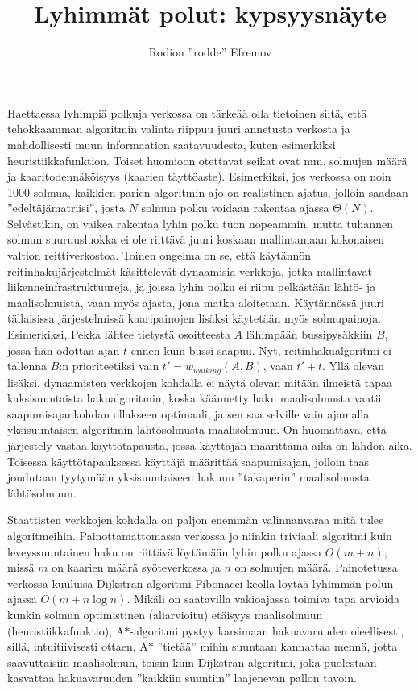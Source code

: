 \documentclass[12pt]{article}
\title{Lyhimmät polut: kypsyysnäyte}
\author{Rodion ''rodde'' Efremov}
\begin{document}
\maketitle
\newpage

\noindent Haettaessa lyhimpiä polkuja verkossa on tärkeää olla tietoinen siitä, että tehokkaamman algoritmin valinta riippuu juuri annetusta verkosta ja mahdollisesti muun informaation saatavuudesta, kuten esimerkiksi heuristiikkafunktion. Toiset huomioon otettavat seikat ovat mm. solmujen määrä ja kaaritodennäköisyys (kaarien täyttöaste). Esimerkiksi, jos verkossa on noin 1000 solmua, kaikkien parien algoritmin ajo on realistinen ajatus, jolloin saadaan ''edeltäjämatriisi'', josta $N$ solmun polku voidaan rakentaa ajassa $\Theta(N)$. Selvästikin, on vaikea rakentaa lyhin polku tuon nopeammin, mutta tuhannen solmun suuruusluokka ei ole riittävä juuri koskaan mallintamaan kokonaisen valtion reittiverkostoa. Toinen ongelma on se, että käytännön reitinhakujärjestelmät käsittelevät dynaamisia verkkoja, jotka mallintavat liikenneinfrastruktuureja, ja joissa lyhin polku ei riipu pelkästään lähtö- ja maalisolmuista, vaan myös ajasta, jona matka aloitetaan. Käytännössä juuri tällaisissa järjestelmissä kaaripainojen lisäksi käytetään myös solmupainoja. Esimerkiksi, Pekka lähtee tietystä osoitteesta $A$ lähimpään bussipysäkkiin $B$, jossa hän odottaa ajan $t$ ennen kuin bussi saapuu. Nyt, reitinhakualgoritmi ei tallenna $B$:n prioriteetiksi vain $t' = w_{walking}(A, B)$, vaan $t' + t$. Yllä olevan lisäksi, dynaamisten verkkojen kohdalla ei näytä olevan mitään ilmeistä tapaa kaksisuuntaista hakualgoritmin, koska käännetty haku maalisolmusta vaatii saapumisajankohdan ollakseen optimaali, ja sen saa selville vain ajamalla yksisuuntaisen algoritmin lähtösolmusta maalisolmuun. On huomattava, että järjestely vastaa käyttötapausta, jossa käyttäjän määrittämä aika on lähdön aika. Toisessa käyttötapauksessa käyttäjä määrittää saapumisajan, jolloin taas joudutaan tyytymään yksisuuntaiseen hakuun ''takaperin'' maalisolmusta lähtösolmuun.

Staattisten verkkojen kohdalla on paljon enemmän valinnanvaraa mitä tulee algoritmeihin. Painottamattomassa verkossa jo niinkin triviaali algoritmi kuin leveyssuuntainen haku on riittävä löytämään lyhin polku ajassa $O(m + n)$, missä $m$ on kaarien määrä syöteverkossa ja $n$ on solmujen määrä. Painotetussa verkossa kuuluisa Dijkstran algoritmi Fibonacci-keolla löytää lyhimmän polun ajassa $O(m + n \log n)$. Mikäli on saatavilla vakioajassa toimiva tapa arvioida kunkin solmun optimistinen (aliarvioitu) etäisyys maalisolmuun (heuristiikkafunktio), A$\ast$-algoritmi pystyy karsimaan hakuavaruuden oleellisesti, sillä, intuitiivisesti ottaen, A$\ast$ ''tietää'' mihin suuntaan kannattaa mennä, jotta saavuttaisiin maalisolmun, toisin kuin Dijkstran algoritmi, joka puolestaan kasvattaa hakuavaruuden ''kaikkiin suuntiin'' laajenevan pallon tavoin. 
\end{document}
